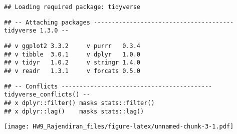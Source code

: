 \documentclass[]{article}
\newenvironment{Shaded}{\begin{snugshade}}{\end{snugshade}}
\newcommand{\CommentTok}[1]{\textcolor[rgb]{0.56,0.35,0.01}{\textit{#1}}}
\newcommand{\DataTypeTok}[1]{\textcolor[rgb]{0.13,0.29,0.53}{#1}}
\newcommand{\DecValTok}[1]{\textcolor[rgb]{0.00,0.00,0.81}{#1}}
\newcommand{\KeywordTok}[1]{\textcolor[rgb]{0.13,0.29,0.53}{\textbf{#1}}}
\newcommand{\NormalTok}[1]{#1}
\newcommand{\OperatorTok}[1]{\textcolor[rgb]{0.81,0.36,0.00}{\textbf{#1}}}
\newcommand{\OtherTok}[1]{\textcolor[rgb]{0.56,0.35,0.01}{#1}}
\newcommand{\StringTok}[1]{\textcolor[rgb]{0.31,0.60,0.02}{#1}}
\begin{document}
\begin{verbatim}
## Loading required package: tidyverse
\end{verbatim}

\begin{verbatim}
## -- Attaching packages --------------------------------------- tidyverse 1.3.0 --
\end{verbatim}

\begin{verbatim}
## v ggplot2 3.3.2     v purrr   0.3.4
## v tibble  3.0.1     v dplyr   1.0.0
## v tidyr   1.0.2     v stringr 1.4.0
## v readr   1.3.1     v forcats 0.5.0
\end{verbatim}

\begin{verbatim}
## -- Conflicts ------------------------------------------ tidyverse_conflicts() --
## x dplyr::filter() masks stats::filter()
## x dplyr::lag()    masks stats::lag()
\end{verbatim}

\begin{Shaded}
\end{Shaded}

\texttt{[image: HW9\_Rajendiran\_files/figure-latex/unnamed-chunk-3-1.pdf]}

\begin{Shaded}
\end{Shaded}
\end{document}
